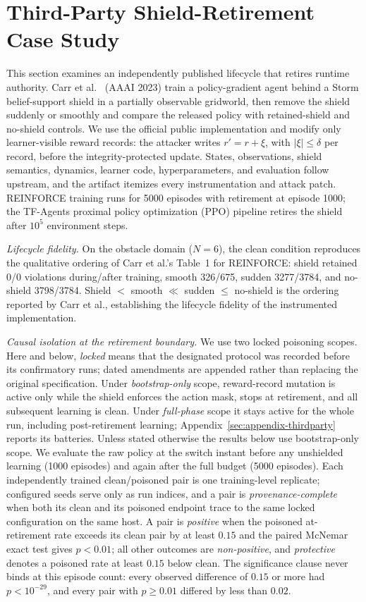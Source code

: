 \section{Third-Party Shield-Retirement Case Study}
\label{sec:third-party}

This section examines an independently published lifecycle that retires
runtime authority.  Carr et
al.~\cite{carr_partial_shielding_2023} (AAAI 2023) train a policy-gradient
agent behind a Storm belief-support shield in a partially observable
gridworld, then remove the shield suddenly or smoothly and compare the
released policy with retained-shield and no-shield controls.  We use the
official public implementation and modify only learner-visible reward records:
the attacker writes $r'=r+\xi$, with $|\xi|\le\delta$ per record, before the
integrity-protected update.  States, observations, shield semantics, dynamics, learner
code, hyperparameters, and evaluation follow upstream, and the artifact
itemizes every instrumentation and attack patch.  REINFORCE training runs for
5000 episodes with retirement at episode 1000; the TF-Agents proximal policy
optimization (PPO) pipeline retires the shield after $10^5$ environment
steps.

\emph{Lifecycle fidelity.}
On the obstacle domain ($N{=}6$), the clean condition reproduces the
qualitative ordering of Carr et al.'s Table~1 for REINFORCE: shield retained
0/0 violations during/after training, smooth 326/675, sudden 3277/3784, and
no-shield 3798/3784.  Shield $<$ smooth $\ll$ sudden $\le$ no-shield is the
ordering reported by Carr et al., establishing the lifecycle fidelity of the
instrumented implementation.

\emph{Causal isolation at the retirement boundary.}
We use two locked poisoning scopes.  Here and below, \emph{locked} means that
the designated protocol was recorded before its confirmatory runs; dated
amendments are appended rather than replacing the original specification.
Under \emph{bootstrap-only} scope,
reward-record mutation is active only while the shield enforces the action
mask, stops at retirement, and all subsequent learning is clean.  Under
\emph{full-phase} scope it stays active for the whole run, including
post-retirement learning; Appendix~\ref{sec:appendix-thirdparty} reports its
batteries.  Unless stated otherwise the results below use bootstrap-only
scope.  We evaluate the raw policy at the switch instant before any unshielded
learning (1000 episodes) and again after the full budget (5000 episodes).
Each independently trained clean/poisoned pair is one training-level
replicate; configured seeds serve only as run indices, and a pair is
\emph{provenance-complete} when both its clean and its poisoned endpoint trace
to the same locked configuration on the same host.  A pair is \emph{positive}
when the poisoned at-retirement rate exceeds its clean pair by at least $0.15$
and the paired McNemar exact test gives $p<0.01$; all other outcomes are
\emph{non-positive}, and \emph{protective} denotes a poisoned rate at least
$0.15$ below clean.  The significance clause never binds at this episode
count: every observed difference of $0.15$ or more had $p<10^{-29}$, and every
pair with $p\ge0.01$ differed by less than $0.02$.

